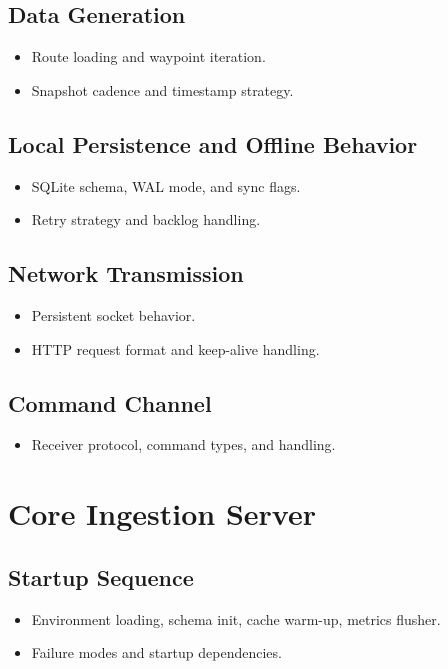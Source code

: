 \documentclass[12pt, a4paper]{article}
\begin{document}
\subsection{Data Generation}
\begin{itemize}[leftmargin=*]
    \item Route loading and waypoint iteration.
    \item Snapshot cadence and timestamp strategy.
\end{itemize}

\subsection{Local Persistence and Offline Behavior}
\begin{itemize}[leftmargin=*]
    \item SQLite schema, WAL mode, and sync flags.
    \item Retry strategy and backlog handling.
\end{itemize}

\subsection{Network Transmission}
\begin{itemize}[leftmargin=*]
    \item Persistent socket behavior.
    \item HTTP request format and keep-alive handling.
\end{itemize}

\subsection{Command Channel}
\begin{itemize}[leftmargin=*]
    \item Receiver protocol, command types, and handling.
\end{itemize}

\section{Core Ingestion Server}
\subsection{Startup Sequence}
\begin{itemize}[leftmargin=*]
    \item Environment loading, schema init, cache warm-up, metrics flusher.
    \item Failure modes and startup dependencies.
\end{itemize}
\end{document}
